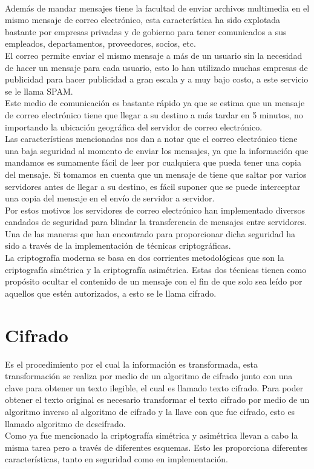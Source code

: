 \documentclass[12pt,oneside,onecolumn,openany]{report}
\begin{document}
\\
Además  de  mandar  mensajes  tiene  la  facultad  de  enviar  archivos  multimedia  en  el mismo mensaje de correo electrónico, esta característica ha sido explotada bastante por empresas   privadas   y   de   gobierno   para   tener   comunicados   a   sus empleados, departamentos, proveedores, socios, etc. 
\\
El  correo  permite  enviar  el  mismo  mensaje  a  más  de  un  usuario  sin  la  necesidad  de hacer un mensaje para cada usuario, esto lo han       utilizado     muchas     empresas     de 
publicidad para hacer publicidad a gran   escala y a muy bajo costo, a este servicio se le llama SPAM. 
\\
Este  medio  de  comunicación  es  bastante  rápido  ya  que  se  estima  que  un  mensaje  de correo  electrónico  tiene  que  llegar  a  su  destino  a  más  tardar  en  5  minutos,  no 
importando la ubicación geográfica del        servidor de correo electrónico. 
\\
Las características mencionadas nos dan a notar que el correo electrónico tiene una baja seguridad al momento de enviar los mensajes, ya que la información que mandamos es 
sumamente fácil de leer por cualquiera que pueda tener una copia del mensaje. Si tomamos en cuenta que un mensaje de tiene que saltar 
por  varios  servidores  antes  de  llegar  a  su  destino,  es  fácil  suponer  que  se puede interceptar una copia del mensaje en el envío de servidor a servidor. 
\\
Por  estos  motivos  los  servidores  de  correo  electrónico  han implementado  diversos candados  de  seguridad  para  blindar  la  transferencia  de  mensajes  entre  servidores.  Una 
de  las  maneras  que  han  encontrado  para  proporcionar  dicha seguridad  ha  sido  a través de la implementación de técnicas criptográficas. 
\\
La criptografía moderna se basa en dos corrientes metodológicas que son la criptografía simétrica  y  la criptografía asimétrica. Estas dos técnicas tienen como propósito ocultar 
el  contenido  de  un  mensaje  con  el  fin  de  que  solo  sea  leído  por  aquellos  que  estén autorizados, a esto se le llama cifrado. 
\section{Cifrado}
Es el procedimiento por el cual  la  información es transformada, esta transformación se realiza por medio de un algoritmo de cifrado junto con una clave para obtener un texto 
ilegible,  el  cual  es  llamado  texto  cifrado.  Para  poder  obtener  el  texto  original  es necesario transformar el texto cifrado por medio de un algoritmo inverso al algoritmo de 
cifrado y la llave con que fue cifrado, esto es llamado algoritmo de descifrado. \\
Como  ya  fue  mencionado  la criptografía simétrica  y asimétrica  llevan a cabo  la  misma tarea  pero  a  través  de  diferentes  esquemas.  Esto  les  proporciona  diferentes  características, tanto en seguridad como en implementación. 
\end{document}
